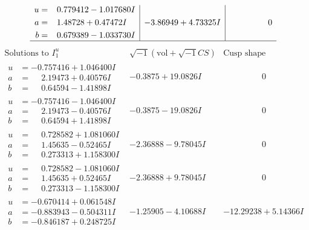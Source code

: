 \documentclass[1p]{elsarticle_modified}
\theoremstyle{definition}
\newcommand{\I}{\sqrt{-1}}
\begin{document}
$$\begin{array}{c|c|c}
\begin{aligned}
u &= \phantom{-}0.779412 - 1.017680 I \\
a &= \phantom{-}1.48728 + 0.47472 I \\
b &= \phantom{-}0.679389 - 1.033730 I\end{aligned}
 & -3.86949 + 4.73325 I & \phantom{-0.000000 } 0\\
 \hline 
 \end{array}$$\newpage$$\begin{array}{c|c|c}  
\text{Solutions to }I^u_{1}& \I (\text{vol} + \sqrt{-1}CS) & \text{Cusp shape}\\
 \hline 
\begin{aligned}
u &= -0.757416 + 1.046400 I \\
a &= \phantom{-}2.19473 + 0.40576 I \\
b &= \phantom{-}0.64594 - 1.41898 I\end{aligned}
 & -0.3875 + 19.0826 I & \phantom{-0.000000 } 0 \\ \hline\begin{aligned}
u &= -0.757416 - 1.046400 I \\
a &= \phantom{-}2.19473 - 0.40576 I \\
b &= \phantom{-}0.64594 + 1.41898 I\end{aligned}
 & -0.3875 - 19.0826 I & \phantom{-0.000000 } 0 \\ \hline\begin{aligned}
u &= \phantom{-}0.728582 + 1.081060 I \\
a &= \phantom{-}1.45635 - 0.52465 I \\
b &= \phantom{-}0.273313 + 1.158300 I\end{aligned}
 & -2.36888 - 9.78045 I & \phantom{-0.000000 } 0 \\ \hline\begin{aligned}
u &= \phantom{-}0.728582 - 1.081060 I \\
a &= \phantom{-}1.45635 + 0.52465 I \\
b &= \phantom{-}0.273313 - 1.158300 I\end{aligned}
 & -2.36888 + 9.78045 I & \phantom{-0.000000 } 0 \\ \hline\begin{aligned}
u &= -0.670414 + 0.061548 I \\
a &= -0.883943 - 0.504311 I \\
b &= -0.846187 + 0.248725 I\end{aligned}
 & -1.25905 - 4.10688 I & -12.29238 + 5.14366 I \\ \hline\begin{aligned}

\end{aligned}
\end{array}$$
\end{document}
